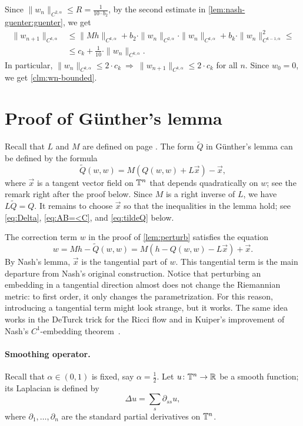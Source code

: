 Since $\|w_n\|_{C^{2,\alpha}}\le R=\tfrac1{10\cdot b_2}$, by the second estimate in \ref{lem:nash-guenter:guenter}, we get
\begin{align*}
\|w_{n+1}\|_{C^{k,\alpha}}
&\le
\|Mh\|_{C^{k,\alpha}}
+
b_2\cdot \|w_n\|_{C^{2,\alpha}}\cdot \|w_n\|_{C^{k,\alpha}}
+
b_k\cdot \|w_n\|_{C^{k-1,\alpha}}^2\le
\\
&\le c_k +\tfrac1{10}\cdot\|w_n\|_{C^{k,\alpha}}.
\end{align*}
In particular, $\|w_n\|_{C^{k,\alpha}}\le 2\cdot c_k
\ \Rightarrow\
\|w_{n+1}\|_{C^{k,\alpha}}\le 2\cdot c_k$
for all $n$.
Since $w_0=0$, we get \ref{clm:wn-bounded}.
\qeds

\section{Proof of Günther's lemma}\label{sec:proof(gunther)}

Recall that $L$ and $M$ are defined on page \pageref{LM}.
The form $\tilde Q$ in Günther's lemma can be defined by the formula
\[\tilde Q(w,w)=M(Q(w,w)+L\vec x)-\vec x,\]
where $\vec x$ is a tangent vector field on $\mathbb{T}^n$ that depends quadratically on $w$;
see the remark right after the proof below.
Since $M$ is a right inverse of $L$, we have $L\tilde Q=Q$.
It remains to choose $\vec x$ so that the inequalities in the lemma hold; see \ref{eq:Delta}, \ref{eq:AB=<C}, and \ref{eq:tildeQ} below.

The correction term $w$ in the proof of \ref{lem:perturb} satisfies the equation
\[w= Mh-\tilde Q(w,w)=M(h-Q(w,w)-L\vec x)+\vec x.\]
By Nash's lemma, $\vec x$ is the tangential part of $w$.
This tangential term is the main departure from Nash's original construction.
Notice that perturbing an embedding in a tangential direction almost does not change the Riemannian metric: to first order, it only changes the parametrization.
For this reason, introducing a tangential term might look strange, but it works.
The same idea works in the DeTurck trick for the Ricci flow \cite[2.2]{brendle} and in Kuiper's improvement of Nash's $C^1$-embedding theorem~\cite{kuiper-1955}.

\paragraph{Smoothing operator.}
Recall that $\alpha\in(0,1)$ is fixed, say $\alpha=\tfrac12$.
Let $u\colon \mathbb{T}^n\to\mathbb{R}$ be a smooth function;
its Laplacian is defined by \label{Du}
\[\Delta u=\sum_s\partial_{ss}u,\]
where $\partial_1,\dots,\partial_n$ are the standard partial derivatives on $\mathbb{T}^n$.

